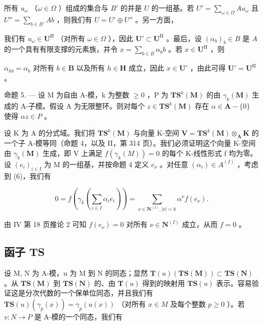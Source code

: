 所有 \(u_{\omega}\) （\(\omega \in \Omega\) ）组成的集合与 \(B'\) 的并是 \(U\) 的一组基。若 \(U' = \sum_{\omega \in \Omega} Au_{\omega}\) 且 \(U'' = \sum_{b \in B'} Ab\) ，则我们有 \(U = U' \oplus U''\) 。另一方面，

我们有 \(u_{\omega} \in \mathbf{U}^{\mathrm{H}}\) （对所有 \(\omega \in \Omega\) ），因此 \(\mathbf{U}' \subset \mathbf{U}^{\mathrm{H}}\) 。最后，设 \((\alpha_b)_b \in B\) 是 \(A\) 的一个具有有限支撑的元素族，并令 \(x = \sum_{b \in B} \alpha_b b\) 。若 \(x \in \mathbf{U}^{\mathrm{H}}\) ，则

\(\alpha_{hb} = \alpha_b\) 对所有 \(b \in \mathbf{B}\) 以及所有 \(h \in \mathbf{H}\) 成立，因此 \(x \in \mathbf{U}'\) ，由此可得 \(\mathbf{U}' = \mathbf{U}^{\mathrm{H}}\) 。

命题 5. --- 设 M 为自由 A-模，k 为整数 \(\geqslant0\) ，P 为 \(\mathbf{TS}^{k}(\mathbf{M})\) 的由 \(\gamma_{k}(\mathbf{M})\) 生成的 A-子模。假设 A 为无限整环。则对每个 \(z\in\mathbf{TS}^{k}(\mathbf{M})\) 存在 \(\alpha\in\mathbf{A}-\{0\}\) 使得 \(\alpha z\in P\) 。

设 K 为 A 的分式域。我们将 \(\mathbf{T}\mathbf{S}^{k}(\mathbf{M})\) 与向量 K-空间 \(\mathbf{V} = \mathbf{T}\mathbf{S}^{k}(\mathbf{M}) \otimes_{\mathbf{A}} \mathbf{K}\) 的一个子 A-模等同（命题 4，以及 II，第 314 页）。我们必须证明这个向量 K-空间由 \(\gamma_{k}(\mathbf{M})\) 生成，即 V 上满足 \(f(\gamma_k(M)) = 0\) 的每个 K-线性形式 f 均为零。设 \((e_i)_{i \in I}\) 为 M 的一组基，并按命题 4 定义 \(e_\nu\) 。对任意 \((\alpha_i) \in A^{(I)}\) ，考虑到 (6)，我们有

\[
0 = f \left(\gamma_ {k} \left(\sum_ {i \in I} \alpha_ {i} e _ {i}\right)\right) = \sum_ {\nu \in \mathbf {N} ^ {(I)}, | \nu | = k} \alpha^ {\nu} f (e _ {\nu}).
\]

由 IV 第 18 页推论 2 可知 \(f(e_{\nu}) = 0\) 对所有 \(\nu \in \mathbf{N}^{(I)}\) 成立，从而 \(f = 0\) 。

\subsection{函子 TS}

设 M, N 为 A-模，u 为 M 到 N 的同态；显然 \(\mathbf{T}(u)(\mathbf{TS}(\mathbf{M})) \subset \mathbf{TS}(\mathbf{N})\) 。从 \(\mathbf{TS}(\mathbf{M})\) 到 \(\mathbf{TS}(\mathbf{N})\) 的、由 \(\mathbf{T}(u)\) 得到的映射用 \(\mathbf{TS}(u)\) 表示。容易验证这是分次代数的一个保单位同态，并且我们有 \(\mathbf{TS}(u)\left(\gamma_{p}(x)\right) = \gamma_{p}(u(x))\) （对所有 \(x \in M\) 及每个整数 \(p \geqslant 0\) ）。若 \(v : N \to P\) 是 A-模的一个同态，我们有

